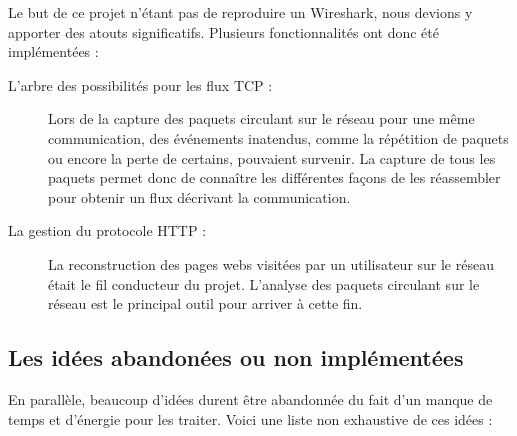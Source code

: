 Le but de ce projet n'étant pas de reproduire un Wireshark, nous devions y apporter des atouts significatifs. Plusieurs fonctionnalités ont donc été implémentées :

\begin{description}
\item[L'arbre des possibilités pour les flux TCP :] Lors de la capture des paquets circulant sur le réseau pour une même communication, des événements inatendus, comme la répétition de paquets ou encore la perte de certains,  pouvaient survenir. La capture de tous les paquets permet donc de connaître les différentes façons de les réassembler pour obtenir un flux décrivant la communication. 
\item[La gestion du protocole HTTP :] La reconstruction des pages webs visitées par un utilisateur sur le réseau était le fil conducteur du projet. L'analyse des paquets circulant sur le réseau est le principal outil pour arriver à cette fin.\\
\end{description}

\subsection{Les idées abandonées ou non implémentées}
En parallèle, beaucoup d'idées durent être abandonnée du fait d'un manque de temps et d'énergie pour les traiter. Voici une liste non exhaustive de ces idées :
